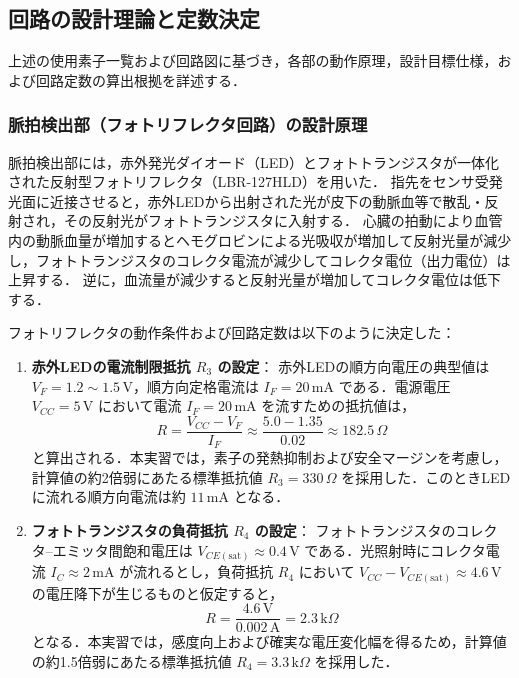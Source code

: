 \subsection{回路の設計理論と定数決定}

上述の使用素子一覧および回路図に基づき，各部の動作原理，設計目標仕様，および回路定数の算出根拠を詳述する．

\subsubsection{脈拍検出部（フォトリフレクタ回路）の設計原理}

脈拍検出部には，赤外発光ダイオード（LED）とフォトトランジスタが一体化された反射型フォトリフレクタ（LBR-127HLD\cite{LBR-127HLD}）を用いた．
指先をセンサ受発光面に近接させると，赤外LEDから出射された光が皮下の動脈血等で散乱・反射され，その反射光がフォトトランジスタに入射する．
心臓の拍動により血管内の動脈血量が増加するとヘモグロビンによる光吸収が増加して反射光量が減少し，フォトトランジスタのコレクタ電流が減少してコレクタ電位（出力電位）は上昇する．
逆に，血流量が減少すると反射光量が増加してコレクタ電位は低下する．

フォトリフレクタの動作条件および回路定数は以下のように決定した：
\begin{enumerate}
  \item \textbf{赤外LEDの電流制限抵抗 $R_3$ の設定}：
        赤外LEDの順方向電圧の典型値は $V_F = 1.2 \sim 1.5\,\mathrm{V}$，順方向定格電流は $I_F = 20\,\mathrm{mA}$ である．電源電圧 $V_{CC} = 5\,\mathrm{V}$ において電流 $I_F = 20\,\mathrm{mA}$ を流すための抵抗値は，
        \begin{equation}
          R = \frac{V_{CC} - V_F}{I_F} \approx \frac{5.0 - 1.35}{0.02} \approx 182.5\,\Omega
          \label{eq:R3_calc}
        \end{equation}
        と算出される．本実習では，素子の発熱抑制および安全マージンを考慮し，計算値の約2倍弱にあたる標準抵抗値 $R_3 = 330\,\Omega$ を採用した．このときLEDに流れる順方向電流は約 $11\,\mathrm{mA}$ となる．

  \item \textbf{フォトトランジスタの負荷抵抗 $R_4$ の設定}：
        フォトトランジスタのコレクタ--エミッタ間飽和電圧は $V_{CE(\mathrm{sat})} \approx 0.4\,\mathrm{V}$ である．光照射時にコレクタ電流 $I_C \approx 2\,\mathrm{mA}$ が流れるとし，負荷抵抗 $R_4$ において $V_{CC} - V_{CE(\mathrm{sat})} \approx 4.6\,\mathrm{V}$ の電圧降下が生じるものと仮定すると，
        \begin{equation}
          R = \frac{4.6\,\mathrm{V}}{0.002\,\mathrm{A}} = 2.3\,\mathrm{k}\Omega
          \label{eq:R4_calc}
        \end{equation}
        となる．本実習では，感度向上および確実な電圧変化幅を得るため，計算値の約1.5倍弱にあたる標準抵抗値 $R_4 = 3.3\,\mathrm{k}\Omega$ を採用した．
\end{enumerate}

